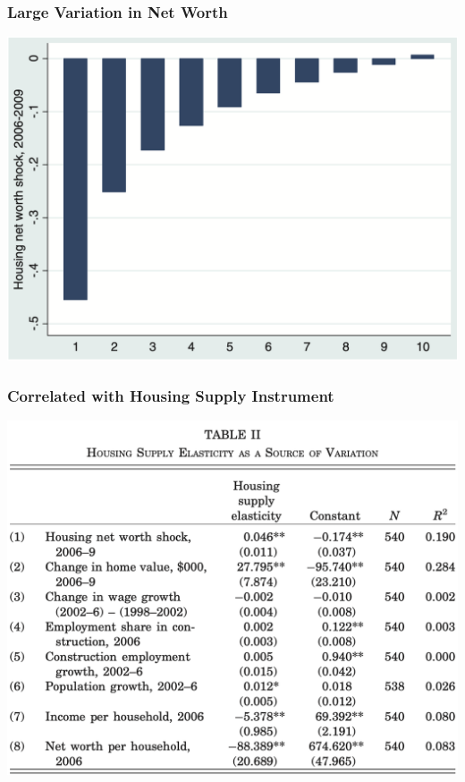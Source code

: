 \documentclass[english,xcolor=svgnames]{beamer}
\begin{document}
\begin{frame}
\frametitle[alignment=center]{Large Variation in Net Worth}
\centering
\includegraphics[scale=0.4]{figures/MRSFIG2.png}
\end{frame}

\begin{frame}
\frametitle[alignment=center]{Correlated with Housing Supply Instrument}
\centering
\includegraphics[scale=0.4]{figures/MRSTAB2.png}
\end{frame}
\end{document}
